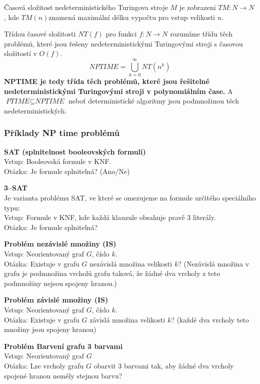 Časová složitost nedeterministického Turingova stroje $M$ je zobrazeni $TM : N \rightarrow N$, kde $TM(n)$znamená maximální délku vypočtu pro vstup velikosti $n$.

Třídou časové složitosti $NT(f)$ pro funkci $f : N \rightarrow N$ rozumíme třídu těch problémů, které jsou řešeny nedeterministickými Turingovými stroji s časovou složitostí v $O(f)$.
\begin{equation}
\textit{NPTIME} = \bigcup_{k=0}^{\infty}NT(n^k)
\end{equation}
\noindent \textbf{NPTIME  je  tedy  třída  těch  problémů,  které  jsou řešitelné  nedeterministickými  Turingovými stroji v polynomiálním čase.} 
A $\textit{PTIME} \subseteq \textit{NPTIME}$ neboť deterministické algoritmy jsou podmnožinou těch nedeterministických.

\subsubsection{Příklady NP time problémů}
\textbf{SAT (splnitelnost booleovských formuli)}\\
Vstup: Booleovská formule v KNF.\\
Otázka: Je formule splnitelná? (Ano/Ne)

\textbf{3--SAT}\\
Je varianta problému SAT, ve které se omezujeme na formule určitého speciálního typu: \\
Vstup: Formule v KNF, kde každá klauzule obsahuje pravě 3 literály. \\
Otázka: Je formule splnitelná?

\textbf{Problém nezávislé množiny (IS)}\\
Vstup: Neorientovaný graf $G$, číslo $k$.\\
Otázka: Existuje v grafu $G$ nezávislá množina velikosti $k$? (Nezávislá množina v grafu je podmnožina vrcholů grafu taková, že žádné dva vrcholy z teto podmnožiny nejsou spojeny hranou.)

\textbf{Problém závislé množiny (IS)}\\
Vstup: Neorientovaný graf $G$, číslo $k$.\\
Otázka: Existuje v grafu $G$ závislá množina velikosti $k$? (každé dva vrcholy teto množiny jsou spojeny hranou)

\textbf{Problém Barvení grafu 3 barvami}\\
Vstup: Neorientovaný graf $G$\\
Otázka: Lze vrcholy grafu $G$ obarvit 3 barvami tak, aby žádné dva vrcholy spojené hranou neměly stejnou barvu?


